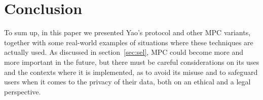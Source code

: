 \section{Conclusion}

To sum up, in this paper we presented Yao's protocol and other MPC variants, together with some real-world examples of situations where these techniques are actually used. As discussed in section~\ref{sec:sel}, MPC could become more and more important in the future, but there must be careful considerations on its uses and the contexts where it is implemented, as to avoid its misuse and to safeguard users when it comes to the privacy of their data, both on an ethical and a legal perspective.